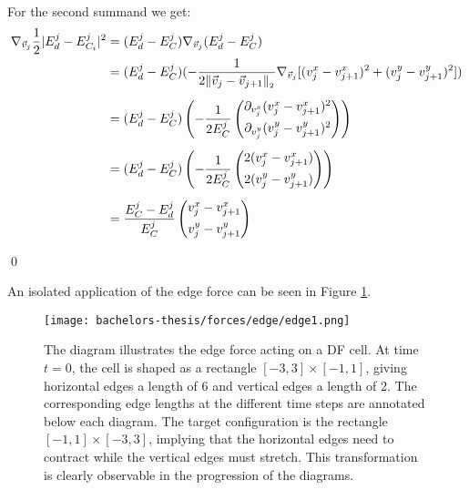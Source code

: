 \begin{proposition}
	For the second summand we get:
	\begin{align*}
		\nabla_{\vec{v}_{j}} \frac{1}{2} | E^{j}_d - E^j_{C_i}|^2 &= (E^j_d - E^j_C) \nabla_{\vec{v}_j} (E^j_d - E^j_C) \\
		&= (E^j_d - E^j_C) (- \frac{1}{2 \norm[\vec{v}_j - \vec{v}_{j+1}]} \nabla_{\vec{v}_j} [(v_j^{x} - v_{j+1}^{x})^2 + (v_j^{y} - v_{j+1}^{y})^2]) \\[0.5em] 
		&= (E^j_d - E^j_C) \left(- \frac{1}{2 E^j_C} \begin{pmatrix}
			\partial_{v_j^{x}} (v_j^{x} - v_{j+1}^{x})^2 \\[0.5em]
			\partial_{v_j^{y}} (v_j^{y} - v_{j+1}^{y})^2
		\end{pmatrix}\right) \\[0.5em]
		&= (E^j_d - E^j_C) \left(- \frac{1}{2 E^j_C} \begin{pmatrix}
			 2(v_j^{x} - v_{j+1}^{x}) \\[0.5em]
			 2(v_j^{y} - v_{j+1}^{y})
		\end{pmatrix}\right) \\[0.5em] 
		&= \frac{E^j_C - E^j_d}{E^j_C} \begin{pmatrix}
			v_j^{x} - v_{j+1}^{x} \\[0.5em]
			v_j^{y} - v_{j+1}^{y}
	   \end{pmatrix} 
	\end{align*}
	
	

	\qed  
\end{proposition}

An isolated application of the edge force can be seen in Figure \ref{fig:edgeForce}.  

\begin{figure}
	\begin{center}
		\texttt{[image: bachelors-thesis/forces/edge/edge1.png]}
		\caption{The diagram illustrates the edge force acting on a DF cell.
		At time $t=0$, the cell is shaped as a rectangle $[-3,3]\times [-1,1]$, giving horizontal edges a length of 6 and vertical edges a length of 2.
		The corresponding edge lengths at the different time steps are annotated below each diagram.
		The target configuration is the rectangle $[-1,1]\times [-3,3]$, implying that the horizontal edges need to contract while the vertical edges must stretch.
		This transformation is clearly observable in the progression of the diagrams.
		}
		\label{fig:edgeForce}
	\end{center}
\end{figure}


